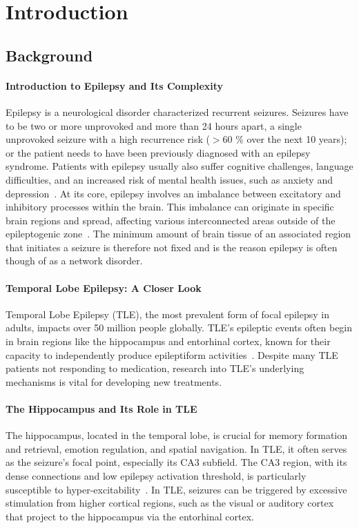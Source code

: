 \chapter{Introduction}


\section{Background}
\subsubsection{Introduction to Epilepsy and Its Complexity}
Epilepsy is a neurological disorder characterized recurrent seizures.
Seizures have to be two or more unprovoked and more than 24 hours apart, a single unprovoked
seizure with a high recurrence risk (\(>\)60 \% over the next 10 years); or the patient needs to have been previously diagnosed with an epilepsy syndrome.
Patients with epilepsy usually also suffer cognitive challenges, language difficulties, and an increased risk of mental health issues,
such as anxiety and depression~\parencite{fisherILAEOfficialReport2014}. At its core, epilepsy
involves an imbalance between excitatory and inhibitory processes within the brain.
This imbalance can originate in specific brain regions and spread, affecting various interconnected areas
outside of the epileptogenic zone~\parencite{ludersEpileptogenicZoneGeneral2006}.
The minimum amount of brain tissue of an associated region that initiates a seizure is therefore not fixed and is the
reason epilepsy is often though of as a network disorder.

\subsubsection{Temporal Lobe Epilepsy: A Closer Look}
Temporal Lobe Epilepsy (TLE), the most prevalent form of focal epilepsy in adults,
impacts over 50 million people globally. TLE's epileptic events often begin in
brain regions like the hippocampus and entorhinal cortex, known for their
capacity to independently produce epileptiform activities~\parencite{lyttonComputerSimulationEpilepsy2005}.
Despite many TLE patients not responding to medication, research into TLE's
underlying mechanisms is vital for developing new treatments.

\subsubsection{The Hippocampus and Its Role in TLE}
The hippocampus, located in the temporal lobe, is crucial for memory formation
and retrieval, emotion regulation, and spatial navigation. In TLE, it often
serves as the seizure's focal point, especially its CA3 subfield. The CA3 region,
with its dense connections and low epilepsy activation threshold, is particularly
susceptible to hyper-excitability~\parencite{witterIntrinsicExtrinsicWiring2007}.
In TLE, seizures can be triggered by excessive stimulation from higher cortical regions, such as the visual or auditory cortex
that project to the hippocampus via the entorhinal cortex.

